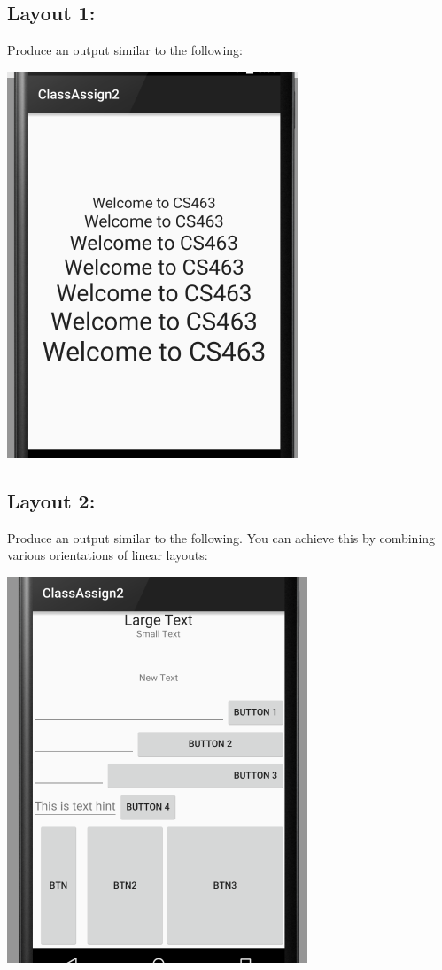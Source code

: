 \subsection{Layout 1:}
Produce an output similar to the following:
\begin{center}
	\includegraphics[scale=0.4]{chapters/ch03/images/27}
\end{center}

\subsection{Layout 2:}
Produce an output similar to the following. You can achieve this by combining various orientations of linear layouts:

\begin{center}
	\includegraphics[scale=0.4]{chapters/ch03/images/28}
\end{center}

